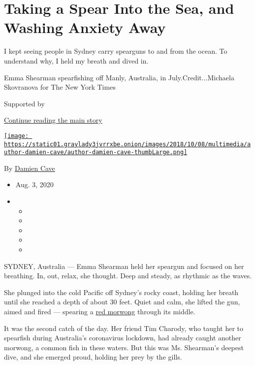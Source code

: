 \hypertarget{taking-a-spear-into-the-sea-and-washing-anxiety-away}{%
\section{Taking a Spear Into the Sea, and Washing Anxiety
Away}\label{taking-a-spear-into-the-sea-and-washing-anxiety-away}}

I kept seeing people in Sydney carry spearguns to and from the ocean. To
understand why, I held my breath and dived in.

Emma Shearman spearfishing off Manly, Australia, in
July.Credit...Michaela Skovranova for The New York Times

Supported by

\protect\hyperlink{after-sponsor}{Continue reading the main story}

\href{https://www.nytimes3xbfgragh.onion/by/damien-cave}{\texttt{[image: https://static01.graylady3jvrrxbe.onion/images/2018/10/08/multimedia/author-damien-cave/author-damien-cave-thumbLarge.png]}}

By \href{https://www.nytimes3xbfgragh.onion/by/damien-cave}{Damien Cave}

\begin{itemize}
\item
  Aug. 3, 2020
\item
  \begin{itemize}
  \item
  \item
  \item
  \item
  \item
  \end{itemize}
\end{itemize}

SYDNEY, Australia --- Emma Shearman held her speargun and focused on her
breathing. In, out, relax, she thought. Deep and steady, as rhythmic as
the waves.

She plunged into the cold Pacific off Sydney's rocky coast, holding her
breath until she reached a depth of about 30 feet. Quiet and calm, she
lifted the gun, aimed and fired --- spearing a
\href{https://www.dpi.nsw.gov.au/fishing/fish-species/species-list/red-morwong}{red
morwong} through its middle.

It was the second catch of the day. Her friend Tim Charody, who taught
her to spearfish during Australia's coronavirus lockdown, had already
caught another morwong, a common fish in these waters. But this was Ms.
Shearman's deepest dive, and she emerged proud, holding her prey by the
gills.

